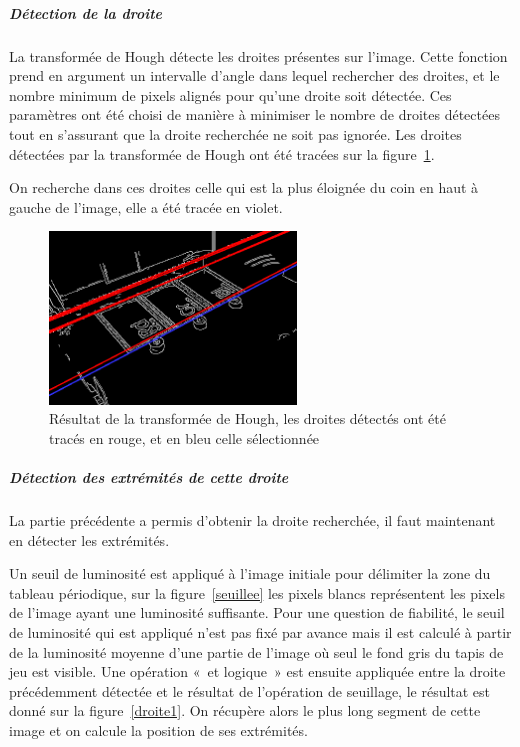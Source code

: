 \documentclass{article}
\begin{document}
\subparagraph{Détection de la droite}
La transformée de Hough détecte les droites présentes sur l’image. Cette fonction prend en argument un intervalle d’angle dans lequel rechercher des droites,
et le nombre minimum de pixels alignés pour qu’une droite soit détectée. Ces paramètres ont été choisi de manière à minimiser le nombre de droites détectées tout
en s’assurant que la droite recherchée ne soit pas ignorée. Les droites détectées par la transformée de Hough ont été tracées sur la figure~\ref{hough1}.

On recherche dans ces droites celle qui est la plus éloignée du coin en haut à gauche de l’image, elle a été tracée en violet.
\begin{figure}[!h]
\begin{center}
\includegraphics[height=130pt]{image_Canny_hough1.png}  
\end{center}
\caption{Résultat de la transformée de Hough, les droites détectés ont été tracés en rouge, et en bleu celle sélectionnée}
\label{hough1}
\end{figure}

\subparagraph{Détection des extrémités de cette droite}
La partie précédente a permis d’obtenir la droite recherchée, il faut maintenant en détecter les extrémités.

Un seuil de luminosité est appliqué à l’image initiale pour délimiter la zone du tableau périodique, sur la figure~\ref{seuillee} les pixels blancs
représentent les pixels de l’image ayant une luminosité suffisante. Pour une question de fiabilité, le seuil de luminosité qui est
appliqué n’est pas fixé par avance mais il est calculé à partir de la luminosité moyenne d’une partie de l’image où seul le fond gris
du tapis de jeu est visible.
Une opération « et logique » est ensuite appliquée entre la droite précédemment détectée et le résultat de l’opération de seuillage,
le résultat est donné sur la figure~\ref{droite1}. On récupère alors le plus long segment de cette image et on calcule la position de ses extrémités.
\end{document}
